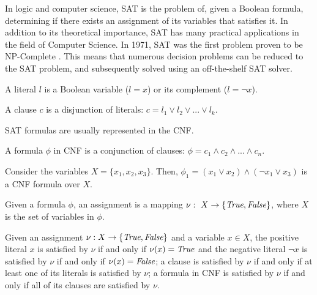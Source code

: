 In logic and computer science, \ac{SAT} is the problem of, given a Boolean formula, determining if there exists an assignment of its variables that satisfies it.
%
In addition to its theoretical importance, \ac{SAT} has many practical applications in the field of Computer Science. In 1971, \ac{SAT} was the first problem proven to be NP-Complete \cite{DBLP:conf/stoc/Cook71}. This means that numerous decision problems can be reduced to the \ac{SAT} problem, and subsequently solved using an off-the-shelf \ac{SAT} solver.

\begin{definition}[Literal]
A literal \(l\) is a Boolean variable (\(l = x\)) or its complement (\(l = \neg x\)).
\end{definition}

\begin{definition}[Clause]
A clause \(c\) is a disjunction of literals: \(c = l_1 \lor l_2 \lor ... \lor l_k\).
\end{definition}

\noindent
\ac{SAT} formulas are usually represented in the \acf{CNF}. 

\begin{definition}
A formula \(\phi\) in \ac{CNF} is a conjunction of clauses: \(\phi = c_1 \land c_2 \land ... \land c_n\).
\end{definition}

\begin{example}\label{ex:CNF_formula}
Consider the variables \(X = \{x_1, x_2, x_3\}\). Then, \(\phi_1 = (x_1 \lor x_2) \land (\neg x_1 \lor x_3)\) is a \ac{CNF} formula over \(X\).
\end{example}

\begin{definition}[Assignment]
Given a formula \(\phi\), an assignment is a mapping \(\nu:~X\rightarrow\{\textit{True},\textit{False}\}\), where \(X\) is the set of variables in \(\phi\).
\end{definition}

\noindent
Given an assignment \(\nu : X \rightarrow \{\textit{True}, \textit{False}\}\) and a variable \(x \in X\), the positive literal \(x\) is satisfied by \(\nu\) if and only if \(\nu(x) = \textit{True}\) and the negative literal \(\neg x\) is satisfied by \(\nu\) if and only if \(\nu(x) = \textit{False}\); a clause is satisfied by \(\nu\) if and only if at least one of its literals is satisfied by \(\nu\); a formula in CNF is satisfied by \(\nu\) if and only if all of its clauses are satisfied by \(\nu\).

